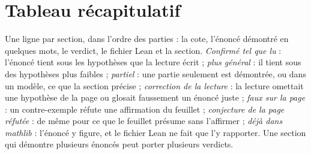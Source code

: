 \section*{Tableau récapitulatif}

Une ligne par section, dans l'ordre des parties : la cote, l'énoncé démontré en quelques mots, le verdict, le fichier Lean et la section. \emph{Confirmé tel que lu} : l'énoncé tient sous les hypothèses que la lecture écrit ; \emph{plus général} : il tient sous des hypothèses plus faibles ; \emph{partiel} : une partie seulement est démontrée, ou dans un modèle, ce que la section précise ; \emph{correction de la lecture} : la lecture omettait une hypothèse de la page ou glosait faussement un énoncé juste ; \emph{faux sur la page} : un contre-exemple réfute une affirmation du feuillet ; \emph{conjecture de la page réfutée} : de même pour ce que le feuillet présume sans l'affirmer ; \emph{déjà dans mathlib} : l'énoncé y figure, et le fichier Lean ne fait que l'y rapporter. Une section qui démontre plusieurs énoncés peut porter plusieurs verdicts.

